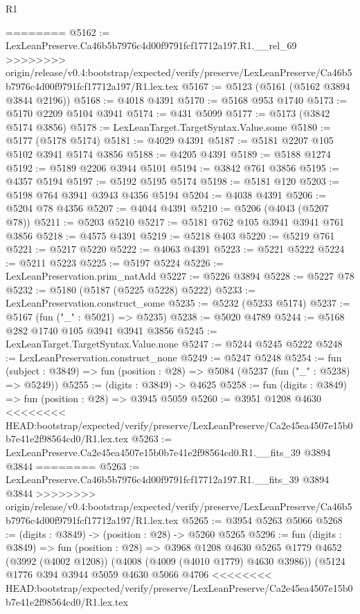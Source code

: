 \begin{lexlean}{R1}
\begin{coremodule}
{{{{{{{{{{{{{{{{{{{{{{{{{{{{{{{{{{{{{{{{{{{{{{{{{{{{{{{{{{{{{{{{{{{{{{{{{{{{{{{{{{{{{{{{{{{{{{{{{{{{{{{{{{{{{{{{{{{{{{{{{{{{{{{{{{{{{{{{{{{{{{{{{{{{{{{{{{{{{{{{{{{{{{{{{{{{{{{{{{{{{{{{{{========
@5162 := LexLeanPreserve.Ca46b5b7976c4d00f9791fcf17712a197.R1.__rel_69
>>>>>>>> origin/release/v0.4:bootstrap/expected/verify/preserve/LexLeanPreserve/Ca46b5b7976c4d00f9791fcf17712a197/R1.lex.tex
@5167 := @5123 (@5161 (@5162 @3894 @3844 @2196))
@5168 := @4018 @4391
@5170 := @5168 @953 @1740
@5173 := @5170 @2209 @5104 @3941
@5174 := @431 @5099
@5177 := @5173 (@3842 @5174 @3856)
@5178 := LexLeanTarget.TargetSyntax.Value.some
@5180 := @5177 (@5178 @5174)
@5181 := @4029 @4391
@5187 := @5181 @2207 @105 @5102 @3941 @5174 @3856
@5188 := @4205 @4391
@5189 := @5188 @1274
@5192 := @5189 @2206 @3944 @5101
@5194 := @3842 @761 @3856
@5195 := @4357 @5194
@5197 := @5192 @5195 @5174
@5198 := @5181 @120
@5203 := @5198 @764 @3941 @3943 @4356 @5194
@5204 := @4038 @4391
@5206 := @5204 @78 @4356
@5207 := @4044 @4391
@5210 := @5206 (@4043 (@5207 @78))
@5211 := @5203 @5210
@5217 := @5181 @762 @105 @3941 @3941 @761 @3856
@5218 := @4575 @4391
@5219 := @5218 @403
@5220 := @5219 @761
@5221 := @5217 @5220
@5222 := @4063 @4391
@5223 := @5221 @5222
@5224 := @5211 @5223
@5225 := @5197 @5224
@5226 := LexLeanPreservation.prim_natAdd
@5227 := @5226 @3894
@5228 := @5227 @78
@5232 := @5180 (@5187 (@5225 @5228) @5222)
@5233 := LexLeanPreservation.construct_some
@5235 := @5232 (@5233 @5174)
@5237 := @5167 (fun ("_" : @5021) => @5235)
@5238 := @5020 @4789
@5244 := @5168 @282 @1740 @105 @3941 @3941 @3856
@5245 := LexLeanTarget.TargetSyntax.Value.none
@5247 := @5244 @5245 @5222
@5248 := LexLeanPreservation.construct_none
@5249 := @5247 @5248
@5254 := fun (subject : @3849) => fun (position : @28) => @5084 (@5237 (fun ("_" : @5238) => @5249))
@5255 := (digits : @3849) -> @4625
@5258 := fun (digits : @3849) => fun (position : @28) => @3945 @5059
@5260 := @3951 @1208 @4630
<<<<<<<< HEAD:bootstrap/expected/verify/preserve/LexLeanPreserve/Ca2e45ea4507e15b0b7e41e2f98564cd0/R1.lex.tex
@5263 := LexLeanPreserve.Ca2e45ea4507e15b0b7e41e2f98564cd0.R1.__fits_39 @3894 @3844
========
@5263 := LexLeanPreserve.Ca46b5b7976c4d00f9791fcf17712a197.R1.__fits_39 @3894 @3844
>>>>>>>> origin/release/v0.4:bootstrap/expected/verify/preserve/LexLeanPreserve/Ca46b5b7976c4d00f9791fcf17712a197/R1.lex.tex
@5265 := @3954 @5263 @5066
@5268 := (digits : @3849) -> (position : @28) -> @5260 @5265
@5296 := fun (digits : @3849) =>
  fun (position : @28) =>
  @3968
    @1208
    @4630
    @5265
    @1779
    @4652
    (@3992 (@4002 @1208))
    (@4008 (@4009 (@4010 @1779) @4630 @3986))
    (@5124
      @1776
      @394
      @3944
      @5059
      @4630
      @5066
      @4706
<<<<<<<< HEAD:bootstrap/expected/verify/preserve/LexLeanPreserve/Ca2e45ea4507e15b0b7e41e2f98564cd0/R1.lex.tex
}}}}}}}}}}}}}}}}}}}}}}}}}}}}}}}}}}}}}}}}}}}}}}}}}}}}}}}}}}}}}}}}}}}}}}}}}}}}}}}}}}}}}}}}}}}}}}}}}}}}}}}}}}}}}}}}}}}}}}}}}}}}}}}}}}}}}}}}}}}}}}}}}}}}}}}}}}}}}}}}}}}}}}}}}}}}}}}}}}}}}}}}}}
\end{coremodule}
\end{lexlean}
